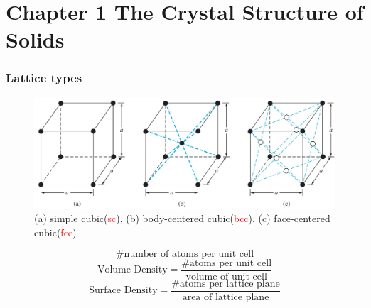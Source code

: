 \documentclass{beamer}
\begin{document}
\section{Chapter 1 The Crystal Structure of Solids}
    \begin{frame} \frametitle{Lattice types}
        \begin{figure}[H]
            \centering
            \includegraphics[width=0.9\linewidth]{Lattice_types.jpg}
            \caption{\tiny (a) simple cubic(\textcolor{red}{sc}), (b) body-centered cubic(\textcolor{red}{bcc}), (c) face-centered cubic(\textcolor{red}{fcc})}
            \label{fig:Lattice_types.jpg}
        \end{figure}
        \begin{equation*}
            \# \text{number of atoms per unit cell}
        \end{equation*}
        \begin{equation*}
            \text{Volume Density} = \frac{\text{\# atoms per unit cell}}{\text{volume of unit cell}} 
        \end{equation*}
        \begin{equation*}
            \text{Surface Density} = \frac{\text{\# atoms per lattice plane}}{\text{area of lattice plane}}
        \end{equation*}
    \end{frame}
    
\end{document}
